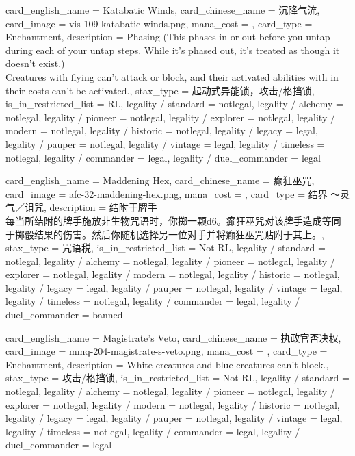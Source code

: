 \documentclass[lang = cn, color = black, 10pt]{AllThatStax}
\begin{document}
\card
{
	card_english_name = {Katabatic Winds},
	card_chinese_name = {沉降气流},
	card_image = vis-109-katabatic-winds.png,
	mana_cost = ,
	card_type = Enchantment,
	description = {Phasing (This phases in or out before you untap during each of your untap steps. While it's phased out, it's treated as though it doesn't exist.)\\
		Creatures with flying can't attack or block, and their activated abilities with  in their costs can't be activated.},
	stax_type = 起动式异能锁，攻击/格挡锁,
	is_in_restricted_list = RL,
	legality / standard = notlegal,
	legality / alchemy = notlegal,
	legality / pioneer = notlegal,
	legality / explorer = notlegal,
	legality / modern = notlegal,
	legality / historic = notlegal,
	legality / legacy = legal,
	legality / pauper = notlegal,
	legality / vintage = legal,
	legality / timeless = notlegal,
	legality / commander = legal,
	legality / duel_commander = legal
}

\card
{
	card_english_name = {Maddening Hex},
	card_chinese_name = {癫狂巫咒},
	card_image = afc-32-maddening-hex.png,
	mana_cost = ,
	card_type = 结界 ～灵气／诅咒,
	description = {结附于牌手\\
		每当所结附的牌手施放非生物咒语时，你掷一颗d6。癫狂巫咒对该牌手造成等同于掷骰结果的伤害。然后你随机选择另一位对手并将癫狂巫咒贴附于其上。},
	stax_type = 咒语税,
	is_in_restricted_list = Not RL,
	legality / standard = notlegal,
	legality / alchemy = notlegal,
	legality / pioneer = notlegal,
	legality / explorer = notlegal,
	legality / modern = notlegal,
	legality / historic = notlegal,
	legality / legacy = legal,
	legality / pauper = notlegal,
	legality / vintage = legal,
	legality / timeless = notlegal,
	legality / commander = legal,
	legality / duel_commander = banned
}

\card
{
	card_english_name = {Magistrate's Veto},
	card_chinese_name = {执政官否决权},
	card_image = mmq-204-magistrate-s-veto.png,
	mana_cost = ,
	card_type = Enchantment,
	description = {White creatures and blue creatures can't block.},
	stax_type = 攻击/格挡锁,
	is_in_restricted_list = Not RL,
	legality / standard = notlegal,
	legality / alchemy = notlegal,
	legality / pioneer = notlegal,
	legality / explorer = notlegal,
	legality / modern = notlegal,
	legality / historic = notlegal,
	legality / legacy = legal,
	legality / pauper = notlegal,
	legality / vintage = legal,
	legality / timeless = notlegal,
	legality / commander = legal,
	legality / duel_commander = legal
}
\end{document}
